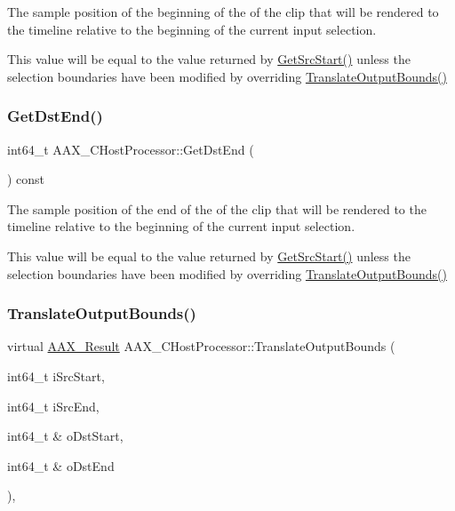 The sample position of the beginning of the of the clip that will be rendered to the timeline relative to the beginning of the current input selection. 

This value will be equal to the value returned by \mbox{\hyperlink{a01485_aec4fa455a4e8ecccc245ce30b596c7b4}{Get\+Src\+Start()}} unless the selection boundaries have been modified by overriding \mbox{\hyperlink{a01485_a4d793e60071069e6f98c4d841d37ac96}{Translate\+Output\+Bounds()}} \mbox{\label{a01485_a282b1b5c2be4f4149458f1ec92950a32}} 
\subsubsection{\texorpdfstring{GetDstEnd()}{GetDstEnd()}}
{\footnotesize\ttfamily int64\+\_\+t A\+A\+X\+\_\+\+C\+Host\+Processor\+::\+Get\+Dst\+End (\begin{DoxyParamCaption}{ }\end{DoxyParamCaption}) const\hspace{0.3cm}{\ttfamily [inline]}}



The sample position of the end of the of the clip that will be rendered to the timeline relative to the beginning of the current input selection. 

This value will be equal to the value returned by \mbox{\hyperlink{a01485_aec4fa455a4e8ecccc245ce30b596c7b4}{Get\+Src\+Start()}} unless the selection boundaries have been modified by overriding \mbox{\hyperlink{a01485_a4d793e60071069e6f98c4d841d37ac96}{Translate\+Output\+Bounds()}} \mbox{\label{a01485_a4d793e60071069e6f98c4d841d37ac96}} 
\subsubsection{\texorpdfstring{TranslateOutputBounds()}{TranslateOutputBounds()}}
{\footnotesize\ttfamily virtual \mbox{\hyperlink{a00392_a4d8f69a697df7f70c3a8e9b8ee130d2f}{A\+A\+X\+\_\+\+Result}} A\+A\+X\+\_\+\+C\+Host\+Processor\+::\+Translate\+Output\+Bounds (\begin{DoxyParamCaption}\item[{int64\+\_\+t}]{i\+Src\+Start,  }\item[{int64\+\_\+t}]{i\+Src\+End,  }\item[{int64\+\_\+t \&}]{o\+Dst\+Start,  }\item[{int64\+\_\+t \&}]{o\+Dst\+End }\end{DoxyParamCaption})\hspace{0.3cm}{\ttfamily [protected]}, {\ttfamily [virtual]}}



